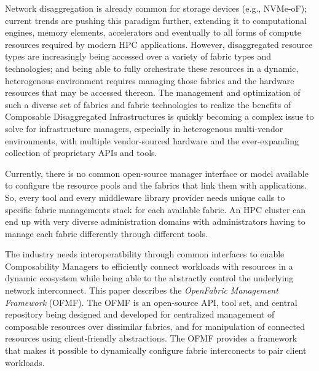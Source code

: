 Network disaggregation is already common for storage devices (e.g., NVMe-oF); current trends are pushing this paradigm further, extending it to computational engines, memory elements, accelerators and eventually to all forms of compute resources required by modern HPC applications. However, disaggregated resource types are increasingly being accessed over a variety of fabric types and technologies; and being able to fully orchestrate these resources in a dynamic, heterogenous environment requires managing those fabrics and the hardware resources that may be accessed thereon. The management and optimization of such a diverse set of fabrics and fabric technologies to realize the benefits of Composable Disaggregated Infrastructures is quickly becoming a complex issue to solve for infrastructure managers, especially in heterogenous multi-vendor environments, with multiple vendor-sourced hardware and the ever-expanding collection of proprietary APIs and tools. 

Currently, there is no common open-source manager interface or model available to configure the resource pools and the fabrics that link them with applications. So, every tool and every middleware library provider needs unique calls to specific fabric managements stack for each available fabric. An HPC cluster can end up with very diverse administration domains with administrators having to manage each fabric differently through different tools.

The industry needs interoperatbility through common interfaces to enable Composability Managers to efficiently connect workloads with resources in a dynamic ecosystem while being able to the abstractly control the underlying network interconnect. This paper describes the \textit{OpenFabric Management Framework} (OFMF). The OFMF is an open-source API, tool set, and central repository being designed and developed for centralized management of composable resources over dissimilar fabrics, and for manipulation of connected resources using client-friendly abstractions. The OFMF provides a framework that makes it possible to dynamically configure fabric interconects to pair client workloads.

  


